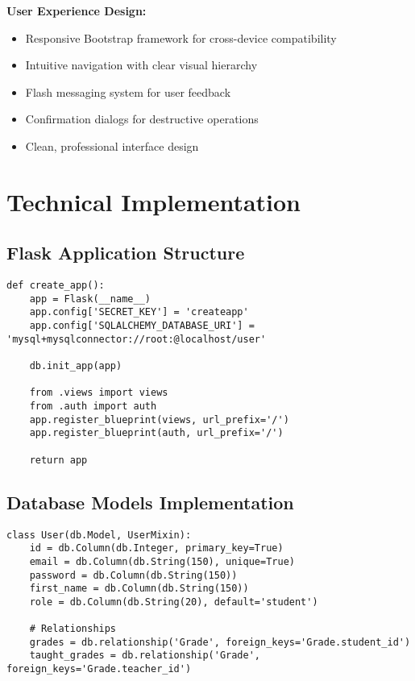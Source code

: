 \documentclass[12pt,a4paper]{article}
\begin{document}
\textbf{User Experience Design:}
\begin{itemize}
    \item Responsive Bootstrap framework for cross-device compatibility
    \item Intuitive navigation with clear visual hierarchy
    \item Flash messaging system for user feedback
    \item Confirmation dialogs for destructive operations
    \item Clean, professional interface design
\end{itemize}

\section{Technical Implementation}

\subsection{Flask Application Structure}

\begin{lstlisting}[caption=Application Factory Pattern]
def create_app():
    app = Flask(__name__)
    app.config['SECRET_KEY'] = 'createapp'
    app.config['SQLALCHEMY_DATABASE_URI'] = 'mysql+mysqlconnector://root:@localhost/user'
    
    db.init_app(app)
    
    from .views import views
    from .auth import auth
    app.register_blueprint(views, url_prefix='/')
    app.register_blueprint(auth, url_prefix='/')
    
    return app
\end{lstlisting}

\subsection{Database Models Implementation}

\begin{lstlisting}[caption=SQLAlchemy Models]
class User(db.Model, UserMixin):
    id = db.Column(db.Integer, primary_key=True)
    email = db.Column(db.String(150), unique=True)
    password = db.Column(db.String(150))
    first_name = db.Column(db.String(150))
    role = db.Column(db.String(20), default='student')
    
    # Relationships
    grades = db.relationship('Grade', foreign_keys='Grade.student_id')
    taught_grades = db.relationship('Grade', foreign_keys='Grade.teacher_id')
\end{lstlisting}
\end{document}
